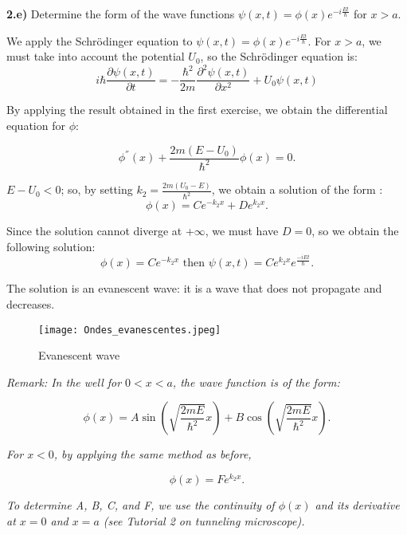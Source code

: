 \noindent \textbf{2.e)} Determine the form of the wave functions $\psi(x,t)= \phi(x) e^{-i \frac{Et}{\hbar}}$ for $x>a$.\\

\begin{breakbox}
    \noindent We apply the Schrödinger equation to $\psi(x,t)= \phi(x) e^{-i \frac{Et}{\hbar}}$. For $x>a$, we must take into account the potential $U_0$, so the Schrödinger equation is:
    \begin{equation*}
        i\hbar\frac{\partial\psi(x,t)}{\partial t}= -\frac{\hbar ^2}{2m}\frac{\partial^2\psi(x,t)}{\partial x^2}+U_0\psi(x,t)  
    \end{equation*}

    \noindent By applying the result obtained in the first exercise, we obtain the differential equation for $\phi$:

    \begin{equation*}
        \phi^{''}(x)+\frac{2m(E-U_0)}{\hbar^2}\phi(x)=0.
    \end{equation*}

    \noindent $\displaystyle E-U_0<0$; so, by setting $\displaystyle k_{2}=\frac{2m(U_0-E)}{\hbar^2}$, we obtain a solution of the form :
    $$\phi(x) = Ce^{-k_{2}x} + De^{k_{2}x}.$$

    \noindent Since the solution cannot diverge at +$\infty$, we must have $D=0$, so we obtain the following solution:
    $$\boxed{\phi(x) = Ce^{-k_{2}x} \text{ then } \psi(x,t) = Ce^{k_{2}x}e^{\frac{-iEt}{\hbar}}.}$$

    \noindent The solution is an evanescent wave: it is a wave that does not propagate and decreases.

    \begin{figure}[H]
        \centering
        \texttt{[image: Ondes\_evanescentes.jpeg]}
        \caption{Evanescent wave}
        \label{fig:enter-label}
    \end{figure}

    \noindent \textit{Remark: In the well for $0<x<a$, the wave function is of the form:}
    
    $$\phi(x) = A \sin(\sqrt{\frac{2mE}{\hbar^2}}x)+B \cos(\sqrt{\frac{2mE}{\hbar^2}}x).$$
    
    \noindent \textit{For $x<0$, by applying the same method as before,}
    
    $$\phi(x) = Fe^{k_{2}x}.$$
    
    \noindent \textit{To determine A, B, C, and F, we use the continuity of $\phi(x)$ and its derivative at $x=0$ and $x=a$ (see Tutorial 2 on tunneling microscope).}
\end{breakbox}

